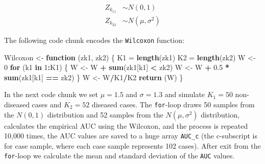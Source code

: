 \documentclass[
]{book}
\newenvironment{Shaded}{\begin{snugshade}}{\end{snugshade}}
\newcommand{\ControlFlowTok}[1]{\textcolor[rgb]{0.13,0.29,0.53}{\textbf{#1}}}
\newcommand{\DecValTok}[1]{\textcolor[rgb]{0.00,0.00,0.81}{#1}}
\newcommand{\FloatTok}[1]{\textcolor[rgb]{0.00,0.00,0.81}{#1}}
\newcommand{\KeywordTok}[1]{\textcolor[rgb]{0.13,0.29,0.53}{\textbf{#1}}}
\newcommand{\NormalTok}[1]{#1}
\newcommand{\OperatorTok}[1]{\textcolor[rgb]{0.81,0.36,0.00}{\textbf{#1}}}
\newcommand{\StringTok}[1]{\textcolor[rgb]{0.31,0.60,0.02}{#1}}
\begin{document}
\begin{align*} 
Z_{k_11} &\sim N\left ( 0,1 \right ) \\ 
Z_{k_22} &\sim N\left ( \mu,\sigma^2 \right )
\end{align*}

The following code chunk encodes the \texttt{Wilcoxon} function:

\begin{Shaded}
\begin{Highlighting}[]
\NormalTok{Wilcoxon \textless{}{-}}\StringTok{ }\ControlFlowTok{function}\NormalTok{ (zk1, zk2)}
\NormalTok{\{}
\NormalTok{  K1 =}\StringTok{ }\KeywordTok{length}\NormalTok{(zk1)}
\NormalTok{  K2 =}\StringTok{ }\KeywordTok{length}\NormalTok{(zk2)}
\NormalTok{  W \textless{}{-}}\StringTok{ }\DecValTok{0}
  \ControlFlowTok{for}\NormalTok{ (k1 }\ControlFlowTok{in} \DecValTok{1}\OperatorTok{:}\NormalTok{K1) \{}
\NormalTok{    W \textless{}{-}}\StringTok{ }\NormalTok{W }\OperatorTok{+}\StringTok{ }\KeywordTok{sum}\NormalTok{(zk1[k1] }\OperatorTok{\textless{}}\StringTok{ }\NormalTok{zk2)}
\NormalTok{    W \textless{}{-}}\StringTok{ }\NormalTok{W }\OperatorTok{+}\StringTok{ }\FloatTok{0.5} \OperatorTok{*}\StringTok{ }\KeywordTok{sum}\NormalTok{(zk1[k1] }\OperatorTok{==}\StringTok{ }\NormalTok{zk2)}
\NormalTok{  \}}
\NormalTok{  W \textless{}{-}}\StringTok{ }\NormalTok{W}\OperatorTok{/}\NormalTok{K1}\OperatorTok{/}\NormalTok{K2}
  \KeywordTok{return}\NormalTok{ (W)}
\NormalTok{\}}
\end{Highlighting}
\end{Shaded}

In the next code chunk we set \(\mu = 1.5\) and \(\sigma = 1.3\) and simulate \(K_1 = 50\) non-diseased cases and \(K_2 = 52\) diseased cases. The \texttt{for}-loop draws 50 samples from the \(N(0,1)\) distribution and 52 samples from the \(N(\mu,\sigma^2)\) distribution, calculates the empirical AUC using the Wilcoxon, and the process is repeated 10,000 times, the AUC values are saved to a huge array \texttt{AUC\_c} (the c-subscript is for case sample, where each case sample represents 102 cases). After exit from the \texttt{for}-loop we calculate the mean and standard deviation of the \texttt{AUC} values.
\end{document}
